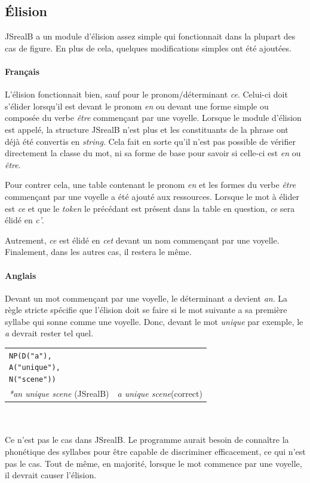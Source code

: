 \documentclass[11pt]{article} %
\newcommand{\system}[1]{\textsf{#1}}
\newcommand{\JSB}{\system{JSrealB}}
\newcommand{\real}[1]{\emph{#1}}
\begin{document}
\subsection{Élision}

\JSB{} a un module d'élision assez simple qui fonctionnait dans la plupart des cas de figure.
En plus de cela, quelques modifications simples ont été ajoutées.
\paragraph{Français}
L'élision fonctionnait bien, sauf pour le pronom/déterminant \emph{ce}. Celui-ci doit
s'élider lorsqu'il est devant le pronom \emph{en} ou devant une forme simple ou composée
du verbe \emph{être} commençant par une voyelle. Lorsque le module d'élision est appelé, la structure \JSB{} n'est plus 
et les constituants de la phrase ont déjà été convertis en \emph{string}. Cela fait en sorte
qu'il n'est pas possible de vérifier directement la classe du mot, ni sa forme de base pour savoir
si celle-ci est \emph{en} ou \emph{être}. 

Pour contrer cela, une table contenant le pronom \emph{en}
et les formes du verbe \emph{être} commençant par une voyelle a été ajouté aux ressources.
Lorsque le mot à élider est \emph{ce} et que le \emph{token} le précédant est présent
dans la table en question, \emph{ce} sera élidé en \emph{c'}. 

Autrement, \emph{ce} est
élidé en \emph{cet} devant un nom commençant par une voyelle. Finalement, dans les autres cas, 
il restera le même.

\paragraph{Anglais}
Devant un mot commençant par une voyelle, le déterminant \emph{a} devient \emph{an}.
La règle stricte spécifie que l'élision doit se faire si le mot suivante a sa première
syllabe qui sonne comme une voyelle. Donc, devant le mot \emph{unique} par exemple,
le \emph{a} devrait rester tel quel. \\
\begin{example}
\caption{}
\begin{tabular}{p{5cm} p{8cm}}
\begin{alltt}
NP(D("a"),
   A("unique"),
   N("scene"))
\end{alltt} &
\begin{alltt}
\end{alltt} \\
\real{*an unique scene} (\JSB{}) & \real{a unique scene}(correct)
\end{tabular}
\end{example}
\\
\\
Ce n'est pas le cas dans \JSB{}. Le programme aurait 
besoin de connaître la phonétique des syllabes pour être capable de discriminer
efficacement, ce qui n'est pas le cas. Tout de même, en majorité, lorsque le mot commence
par une voyelle, il devrait causer l'élision.
\end{document}
